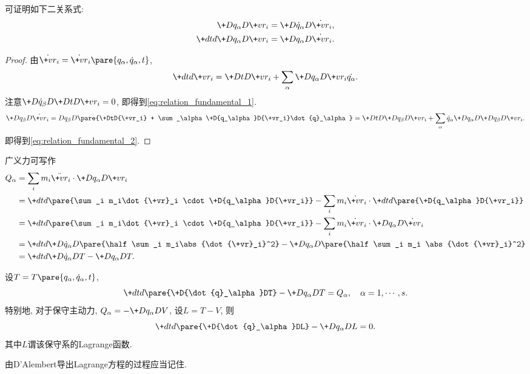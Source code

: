 \documentclass{ctexart}
\begin{document}
可证明如下二关系式:
\begin{align}
    \label{eq:relation_fundamental_1}
    \+D{q_\alpha}D{\+vr_i} &= \+D{\dot{q}_\alpha}D{\dot{\+vr}_i}, \\
    \label{eq:relation_fundamental_2}
    \+dtd{}\+D{q_\alpha}D{\+vr_i} &= \+D{q_\alpha}D{\dot{\+vr}_i}.
\end{align}
\begin{proof}
    由$\dot{\+vr}_i = \dot{\+vr}_i\pare{q_\alpha,\dot{q}_\alpha,t}$,
    \[ \+dtd{\+vr_i} = \+DtD{\+vr_i} + \sum_\alpha \+D{q_\alpha}D{\+vr_i}\dot{q_\alpha}. \]
    注意$\displaystyle \+D{\dot{q}_\beta}D{}\+DtD{\+vr_i} = 0$, 即得到\eqref{eq:relation_fundamental_1}.
    \[ \+D{q_\beta}D{\dot{\+vr}_i} = D{q_\beta}D{}\pare{\+DtD{\+vr_i} + \sum_\alpha \+D{q_\alpha}D{\+vr_i}\dot{q}_\alpha} = \+DtD{}\+D{q_\beta}D{\+vr_i} + \sum_\alpha \dot{q}_\alpha \+D{q_\alpha}D{}\+D{q_\beta}D{\+vr_i}. \]
    即得到\eqref{eq:relation_fundamental_2}.
\end{proof}
广义力可写作
\begin{align*}
    Q_\alpha &= \sum_i m_i\ddot{\+vr}_i \cdot \+D{q_\alpha}D{\+vr_i} \\
    &= \+dtd{} \pare{\sum_i m_i\dot{\+vr}_i \cdot\+D{q_\alpha}D{\+vr_i}} - \sum_i m_i\dot{\+vr}_i \cdot\+dtd{} \pare{\+D{q_\alpha}D{\+vr_i}} \\
    &= \+dtd{} \pare{\sum_i m_i\dot{\+vr}_i \cdot\+D{q_\alpha}D{\+vr_i}} - \sum_i m_i\dot{\+vr}_i\cdot\+D{q_\alpha}D{\dot{\+vr}_i} \\
    &= \+dtd{}\+D{\dot{q}_\alpha}D{} \pare{\half \sum_i m_i\abs{\dot{\+vr}_i}^2} - \+D{q_\alpha}D{} \pare{\half \sum_i m_i \abs{\dot{\+vr}_i}^2} \\
    &= \+dtd{}\+D{\dot{q}_\alpha}DT - \+D{q_\alpha}D{T}.
\end{align*}
\begin{finale}
    \begin{theorem}[Lagrange方程]
        设$T=T\pare{q_\alpha, \dot{q}_\alpha, t}$,
        \[ \+dtd{}\pare{\+D{\dot{q}_\alpha}DT} - \+D{q_\alpha}D{T} = Q_\alpha,\quad \alpha = 1, \cdots, s. \]
        特别地, 对于保守主动力, $Q_\alpha = \displaystyle -\+D{q_\alpha}DV$, 设$L = T-V$, 则
        \[ \+dtd{}\pare{\+D{\dot{q}_\alpha}DL} - \+D{q_\alpha}D{L} = 0. \]
        其中$L$谓该保守系的Lagrange函数.
    \end{theorem}
\end{finale}
\begin{remark}
    由D'Alembert导出Lagrange方程的过程应当记住.
\end{remark}
\end{document}
